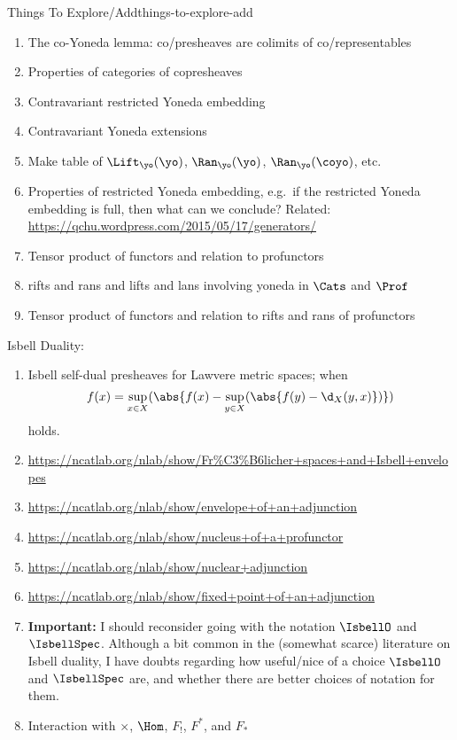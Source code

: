 \begin{remark}{Things To Explore/Add}{things-to-explore-add}
\begin{enumerate}
        \item The co-Yoneda lemma: co/presheaves are colimits of co/representables
        \item Properties of categories of copresheaves
        \item Contravariant restricted Yoneda embedding
        \item Contravariant Yoneda extensions
        \item Make table of $\Lift_{\yo}(\yo)$, $\Ran_{\yo}(\yo)$, $\Ran_{\yo}(\coyo)$, etc.
        \item Properties of restricted Yoneda embedding, e.g.\ if the restricted Yoneda embedding is full, then what can we conclude? Related: \url{https://qchu.wordpress.com/2015/05/17/generators/}
        \item Tensor product of functors and relation to profunctors
        \item rifts and rans and lifts and lans involving yoneda in $\Cats$ and $\Prof$
        \item Tensor product of functors and relation to rifts and rans of profunctors
    \end{enumerate}
    Isbell Duality:
    \begin{enumerate}
        \item Isbell self-dual presheaves for Lawvere metric spaces; when
            \[
                f(x)%
                =%
                \sup_{x\in X}(\abs{f(x)-\sup_{y\in X}(\abs{f(y)-\d_{X}(y,x)})})%
            \]%
            holds.
        \item \url{https://ncatlab.org/nlab/show/Fr\%C3\%B6licher+spaces+and+Isbell+envelopes}
        \item \url{https://ncatlab.org/nlab/show/envelope+of+an+adjunction}
        \item \url{https://ncatlab.org/nlab/show/nucleus+of+a+profunctor}
        \item \url{https://ncatlab.org/nlab/show/nuclear+adjunction}
        \item \url{https://ncatlab.org/nlab/show/fixed+point+of+an+adjunction}
        \item \textbf{Important: }I should reconsider going with the notation $\IsbellO$ and $\IsbellSpec$. Although a bit common in the (somewhat scarce) literature on Isbell duality, I have doubts regarding how useful/nice of a choice $\IsbellO$ and $\IsbellSpec$ are, and whether there are better choices of notation for them.
        \item Interaction with $\times$, $\Hom$, $F_{!}$, $F^{*}$, and $F_{*}$

\end{enumerate}
\end{remark}
